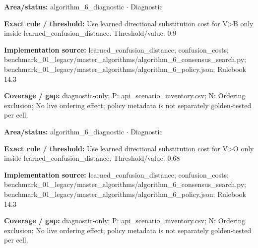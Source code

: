\begin{tcolorbox}[enhanced,breakable,colback=white,colframe=Muted!45,boxrule=0.45pt,arc=1.5pt,left=6pt,right=6pt,top=5pt,bottom=5pt,title={\texttt{A6-LEARNED-SUBSTITUTION-V-B}},title after break={\texttt{A6-LEARNED-SUBSTITUTION-V-B}\ (continued)},fonttitle=\headingfont\bfseries\color{Navy},coltitle=Navy]
\textbf{Area/status:} algorithm\_\allowbreak{}6\_\allowbreak{}diagnostic $\boldsymbol{\cdot}$ Diagnostic\par
\smallskip
\textbf{Exact rule / threshold:} Use learned directional substitution cost for V>B only inside learned\_\allowbreak{}confusion\_\allowbreak{}distance. Threshold/\allowbreak{}value: 0.9\par
\smallskip
\textbf{Implementation source:} learned\_\allowbreak{}confusion\_\allowbreak{}distance; confusion\_\allowbreak{}costs; benchmark\_\allowbreak{}01\_\allowbreak{}legacy/\allowbreak{}master\_\allowbreak{}algorithms/\allowbreak{}algorithm\_\allowbreak{}6\_\allowbreak{}consensus\_\allowbreak{}search.py; benchmark\_\allowbreak{}01\_\allowbreak{}legacy/\allowbreak{}master\_\allowbreak{}algorithms/\allowbreak{}algorithm\_\allowbreak{}6\_\allowbreak{}policy.json; Rulebook 14.3\par
\smallskip
\textbf{Coverage / gap:} diagnostic-only; P: api\_\allowbreak{}scenario\_\allowbreak{}inventory.csv; N: Ordering exclusion; No live ordering effect; policy metadata is not separately golden-tested per cell.
\end{tcolorbox}
\begin{tcolorbox}[enhanced,breakable,colback=white,colframe=Muted!45,boxrule=0.45pt,arc=1.5pt,left=6pt,right=6pt,top=5pt,bottom=5pt,title={\texttt{A6-LEARNED-SUBSTITUTION-V-O}},title after break={\texttt{A6-LEARNED-SUBSTITUTION-V-O}\ (continued)},fonttitle=\headingfont\bfseries\color{Navy},coltitle=Navy]
\textbf{Area/status:} algorithm\_\allowbreak{}6\_\allowbreak{}diagnostic $\boldsymbol{\cdot}$ Diagnostic\par
\smallskip
\textbf{Exact rule / threshold:} Use learned directional substitution cost for V>O only inside learned\_\allowbreak{}confusion\_\allowbreak{}distance. Threshold/\allowbreak{}value: 0.68\par
\smallskip
\textbf{Implementation source:} learned\_\allowbreak{}confusion\_\allowbreak{}distance; confusion\_\allowbreak{}costs; benchmark\_\allowbreak{}01\_\allowbreak{}legacy/\allowbreak{}master\_\allowbreak{}algorithms/\allowbreak{}algorithm\_\allowbreak{}6\_\allowbreak{}consensus\_\allowbreak{}search.py; benchmark\_\allowbreak{}01\_\allowbreak{}legacy/\allowbreak{}master\_\allowbreak{}algorithms/\allowbreak{}algorithm\_\allowbreak{}6\_\allowbreak{}policy.json; Rulebook 14.3\par
\smallskip
\textbf{Coverage / gap:} diagnostic-only; P: api\_\allowbreak{}scenario\_\allowbreak{}inventory.csv; N: Ordering exclusion; No live ordering effect; policy metadata is not separately golden-tested per cell.
\end{tcolorbox}

